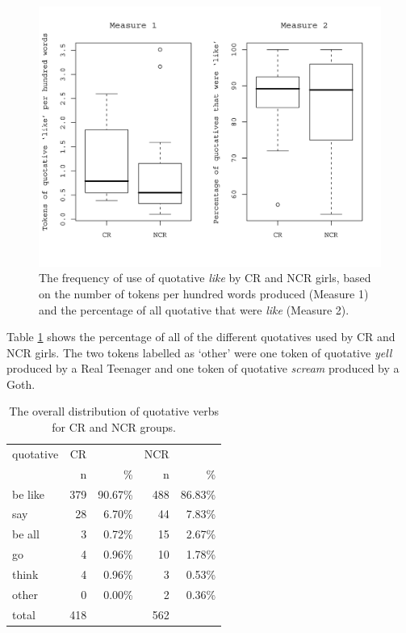 \begin{figure}
	\centering
		\includegraphics[width=5in]{images/ComparingQLikeMeasures.jpg}
	\caption{The frequency of use of quotative \textit{like} by CR and NCR girls, based on the number of tokens per hundred words produced (Measure 1) and the percentage of all quotative that were \textit{like} (Measure 2).}
	\label{fig:ComparingQLikeMeasures}
\end{figure}

Table \ref{tab:diffquotes} shows the percentage of all of the different quotatives used by CR and NCR girls.  The two tokens labelled as `other' were one token of quotative \textit{yell} produced by a Real Teenager and one token of quotative \textit{scream} produced by a Goth. 

\begin{table}[htbp]
\caption{The overall distribution of quotative verbs for CR and NCR groups.}
  \label{tab:diffquotes}
	 \begin{center}
		\begin{tabular}{lrrrr}\hline
	
quotative 		& CR 	&	& NCR &\\
              & n & \% & n & \% \\
  \hline

be like &  379 & 90.67\% &  488 & 86.83\% \\
say   &   28 & 6.70\%  & 44  & 7.83\% \\
be all  &  3 &  0.72\% &  15 & 2.67\% \\
go    &    4 & 0.96\% &   10  & 1.78\% \\
think   &  4 & 0.96\% &  3  & 0.53\% \\
other   &  0  & 0.00\%  & 2 & 0.36\% \\ 
total   &  418 &   & 562 & \\

\hline
		\end{tabular}
	
	\end{center}
\end{table}

